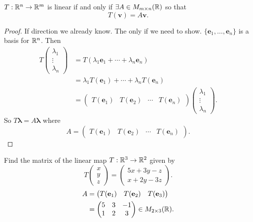 \documentclass[10pt, a4paper]{article}
\newcommand{\mbf}[1]{\mathbf{#1}}
\begin{document}
\begin{lemma}
    $T : \mathbb{R} ^ n \rightarrow \mathbb{R} ^ m$ is linear if and only if $\exists A \in M_{m \times n}(\mathbb{R})$ so that
    \[
    T(\mbf{v}) = A\mbf{v}.
    \]
    \begin{proof}
        If direction we already know.
        The only if we need to show.
        $\{\mbf{e}_1, \dotsc, \mbf{e}_n\}$ is a basis for $\mathbb{R} ^ n$.
        Then
        \begin{align*}
            T\begin{pmatrix}
                \lambda_1 \\ \vdots \\ \lambda_n
            \end{pmatrix} &= T(\lambda_1\mbf{e}_1 + \dotsi + \lambda_n\mbf{e}_n) \\
            &= \lambda_1T(\mbf{e}_1) + \dotsi + \lambda_nT(\mbf{e}_n) \\
            &= \begin{pmatrix}
                T(\mbf{e}_1) & T(\mbf{e}_2) & \dotsi & T(\mbf{e}_n)
            \end{pmatrix}\begin{pmatrix}
                \lambda_1 \\ \vdots \\ \lambda_n
            \end{pmatrix}.
        \end{align*}
        So $T\pmb{\lambda} = A\pmb{\lambda}$ where
        \[
        A = \begin{pmatrix}
                T(\mbf{e}_1) & T(\mbf{e}_2) & \dotsi & T(\mbf{e}_n)
            \end{pmatrix}.
        \]
    \end{proof}
\end{lemma}

\begin{example}
    Find the matrix of the linear map $T : \mathbb{R} ^ 3 \rightarrow \mathbb{R} ^ 2$ given by
    \[
    T\begin{pmatrix}
        x \\ y \\ z
    \end{pmatrix} = \begin{pmatrix}
        5x + 3y - z \\ x + 2y - 3z
    \end{pmatrix}.
    \]
    \begin{align*}
        A &= \begin{pmatrix}
            T(\mbf{e}_1) & T(\mbf{e}_2) & T(\mbf{e}_3)
        \end{pmatrix} \\
        &= \begin{pmatrix}
            5 & 3 & -1 \\ 1 & 2 & 3
        \end{pmatrix} \in M_{2 \times 3}(\R).
    \end{align*}
\end{example}
\end{document}
